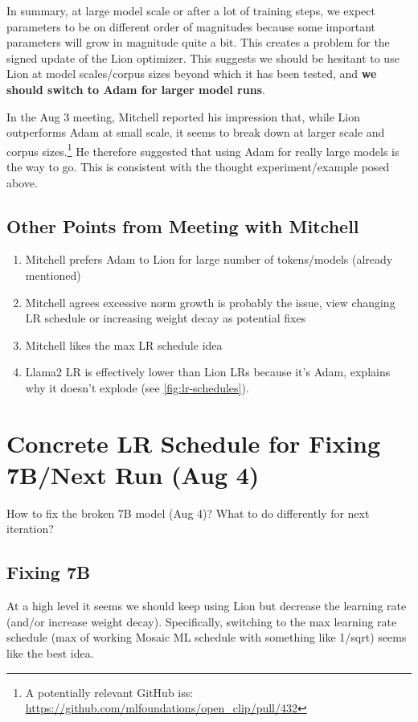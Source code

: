 \documentclass{article}
\begin{document}
In summary, at large model scale or after a lot of training steps, we expect parameters to be on different order of magnitudes because some important parameters will grow in magnitude quite a bit. This creates a problem for the signed update of the Lion optimizer. This suggests we should be hesitant to use Lion at model scales/corpus sizes beyond which it has been tested, and \textbf{we should switch to Adam for larger model runs}.

In the Aug 3 meeting, Mitchell reported his impression that, while Lion outperforms Adam at small scale, it seems to break down at larger scale and corpus sizes.\footnote{A potentially relevant GitHub iss: \url{https://github.com/mlfoundations/open_clip/pull/432}} He therefore suggested that using Adam for really large models is the way to go. This is consistent with the thought experiment/example posed above.

\subsection{Other Points from Meeting with Mitchell}

\begin{enumerate}
    \item Mitchell prefers Adam to Lion for large number of tokens/models (already mentioned)
    \item Mitchell agrees excessive norm growth is probably the issue, view changing LR schedule or increasing weight decay as potential fixes
    \item Mitchell likes the max LR schedule idea
    \item Llama2 LR is effectively lower than Lion LRs because it's Adam, explains why it doesn't explode (see \autoref{fig:lr-schedules}).
\end{enumerate}

\section{Concrete LR Schedule for Fixing 7B/Next Run (Aug 4)}

How to fix the broken 7B model (Aug 4)? What to do differently for next iteration?

\subsection{Fixing 7B}

At a high level it seems we should keep using Lion but decrease the learning rate (and/or increase weight decay). Specifically, switching to the max learning rate schedule (max of working Mosaic ML schedule with something like 1/sqrt) seems like the best idea.
\end{document}
